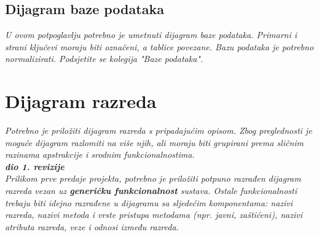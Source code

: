 				
			
			\subsection{Dijagram baze podataka}
				\textit{ U ovom potpoglavlju potrebno je umetnuti dijagram baze podataka. Primarni i strani ključevi moraju biti označeni, a tablice povezane. Bazu podataka je potrebno normalizirati. Podsjetite se kolegija "Baze podataka".}
			
			\eject
			
			
		\section{Dijagram razreda}
		
			\textit{Potrebno je priložiti dijagram razreda s pripadajućim opisom. Zbog preglednosti je moguće dijagram razlomiti na više njih, ali moraju biti grupirani prema sličnim razinama apstrakcije i srodnim funkcionalnostima.}\\
			
			\textbf{\textit{dio 1. revizije}}\\
			
			\textit{Prilikom prve predaje projekta, potrebno je priložiti potpuno razrađen dijagram razreda vezan uz \textbf{generičku funkcionalnost} sustava. Ostale funkcionalnosti trebaju biti idejno razrađene u dijagramu sa sljedećim komponentama: nazivi razreda, nazivi metoda i vrste pristupa metodama (npr. javni, zaštićeni), nazivi atributa razreda, veze i odnosi između razreda.}\\
			
			
			
			
			
			\eject
		
			
			
			
			
